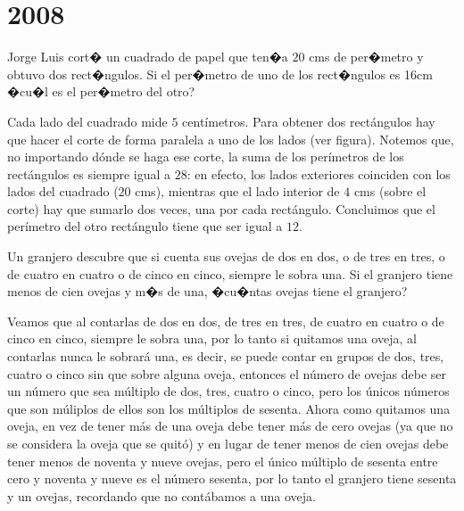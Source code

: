 \chapter{2008}
\label{cha:2008}

\begin{Problema}{1}
  Jorge Luis cort� un cuadrado de papel que ten�a $20$ cms de per�metro y
  obtuvo dos rect�ngulos. Si el per�metro de uno de los rect�ngulos es
  16cm �cu�l es el per�metro del otro?
\end{Problema}

\begin{Solucion}
  Cada lado del cuadrado mide $5$ cent\'imetros. Para obtener dos rect\'angulos
hay que hacer el corte de forma paralela a uno de los lados (ver figura). Notemos que, no importando d\'onde
se haga ese corte, la suma de los per\'imetros de los rect\'angulos es siempre igual a $28$: en efecto,
los lados exteriores coinciden con los lados del cuadrado ($20$ cms), mientras que el lado interior de $4$ cms (sobre
el corte) hay que sumarlo dos veces, una por cada rect\'angulo. Concluimos que el per\'imetro del otro rect\'angulo
tiene que ser igual a $12$.
\end{Solucion}

\begin{Problema}{2}
  Un granjero descubre que si cuenta sus ovejas de dos en dos, o de
  tres en tres, o de cuatro en cuatro o de cinco en cinco, siempre le
  sobra una. Si el granjero tiene menos de cien ovejas y m�s de una,
  �cu�ntas ovejas tiene el granjero?
\end{Problema}

\begin{Solucion}
  Veamos que al contarlas de dos en dos, de tres en tres, de cuatro en cuatro o de cinco en cinco,
siempre le sobra una, por lo tanto si quitamos una oveja, al contarlas nunca le sobrar\'a una, es decir,
se puede contar en grupos de dos, tres, cuatro o cinco sin que sobre alguna oveja, entonces el n\'umero de ovejas
debe ser un n\'umero que sea m\'ultiplo de dos, tres, cuatro o cinco, pero los \'unicos n\'umeros que son m\'uliplos de
ellos son los m\'ultiplos de sesenta.
  Ahora como quitamos una oveja, en vez de tener m\'as de una oveja debe tener m\'as de cero ovejas (ya que no se
considera la oveja que se quit\'o) y en lugar de tener menos de cien ovejas debe tener menos de noventa y nueve ovejas,
pero el \'unico m\'ultiplo de sesenta entre cero y noventa y nueve es el n\'umero sesenta, por lo tanto el granjero tiene
sesenta y un ovejas, recordando que no cont\'abamos a una oveja.

\end{Solucion}

